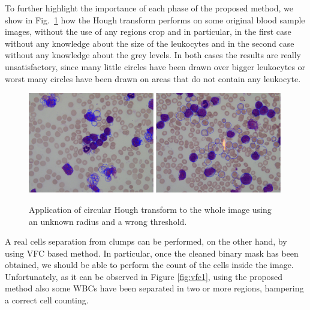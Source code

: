 \documentclass[final,a4paper,12pt,english]{UnicaPhdThesis3}
\begin{document}
To further highlight the importance of each phase of the proposed method, we show in Fig.~\ref{fig:ex10} how the Hough transform performs on some original blood sample images, without the use of any regions crop and in particular, in the first case without any knowledge about the size of the leukocytes and in the second case without any knowledge about the grey levels. In both cases the results are really unsatisfactory, since many little circles have been drawn over bigger leukocytes or worst many circles have been drawn on areas that do not contain any leukocyte. 
\begin{figure}[!t]
	\centering
	\includegraphics[width=0.49\textwidth]{images/2016_1_mva/wrongradius}
	\includegraphics[width=0.49\textwidth]{images/2016_1_mva/wrongthreshold}
	\caption{\label{fig:ex10}Application of circular Hough transform to the whole image using an unknown radius and a wrong threshold.}
\end{figure}

A real cells separation from clumps can be performed, on the other hand, by using VFC based method. 
In particular, once the cleaned binary mask has been obtained, we should be able to perform the count of the cells inside the image. Unfortunately, as it can be observed in Figure \ref{fig:vfc1}, using the proposed method also some WBCs have been separated in two or more regions, hampering a correct cell counting.
\end{document}
